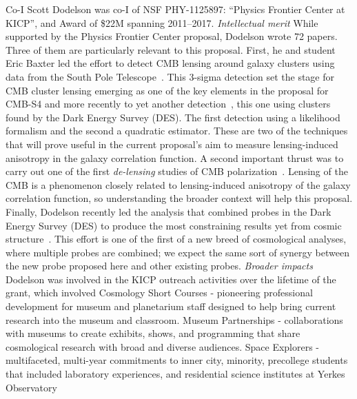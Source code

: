 Co-I Scott Dodelson was co-I of NSF PHY-1125897: ``Physics Frontier Center at KICP'', and Award of \$22M spanning 2011--2017.
{\it Intellectual merit}
While supported by the Physics Frontier Center proposal, Dodelson
wrote 72 papers. Three of them are particularly relevant to this
proposal. First, he and student Eric Baxter led the effort to detect
CMB lensing around galaxy clusters using data from the South Pole
Telescope~\cite{Baxter:2014frs}. This 3-sigma detection set the stage
for CMB cluster lensing emerging as one of the key elements in the
proposal for CMB-S4 and more recently to yet another detection~\cite{Baxter:2017ixz}, this one using clusters found by the Dark Energy
Survey (DES).  The first detection using a likelihood formalism and
the second a quadratic estimator. These are two of the techniques
that will prove useful in the current proposal's aim to measure
lensing-induced anisotropy in the galaxy correlation function.
A second important thrust was to carry out one of the first 
{\it  de-lensing} studies of CMB
polarization~\cite{Manzotti:2017net}. Lensing of the CMB is a 
phenomenon closely related to lensing-induced anisotropy of the galaxy
correlation function, so understanding the broader context will help
this proposal. 
Finally, Dodelson recently led the analysis that combined probes in
the Dark Energy Survey (DES) to produce the most constraining results
yet from cosmic structure~\cite{Abbott:2017wau}. This effort is one
of the first of a new breed of cosmological analyses, where multiple
probes are combined; we expect the same sort of synergy between the
new probe proposed here and other existing probes.
{\it Broader impacts} Dodelson was involved in the KICP outreach
activities over the lifetime of the grant, which involved     
Cosmology Short Courses - pioneering professional development for museum 
and planetarium staff designed to help bring current research into the 
museum and classroom.
 Museum Partnerships - collaborations with museums to create 
exhibits, shows, and programming that share cosmological research with 
broad and diverse audiences.
 Space Explorers - multifaceted, multi-year commitments
to inner city, minority, precollege students that included
 laboratory experiences, 
and residential science institutes at Yerkes Observatory

